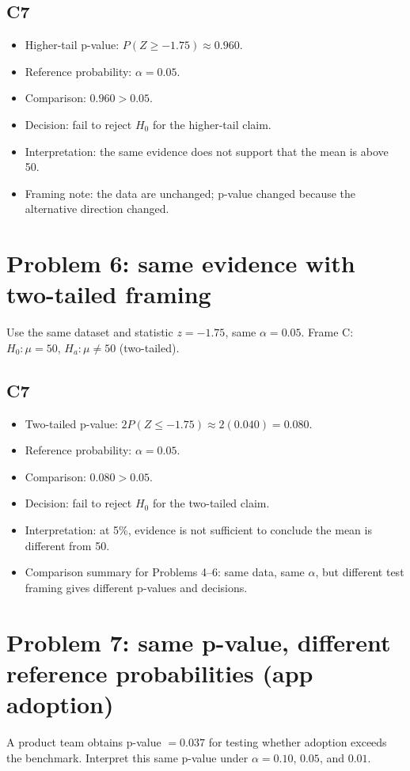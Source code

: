 \begin{ExamProblems}
\subsection*{C7}
\begin{itemize}
    \item Higher-tail p-value: \(P(Z\ge -1.75)\approx 0.960\).
    \item Reference probability: \(\alpha=0.05\).
    \item Comparison: \(0.960>0.05\).
    \item Decision: fail to reject \(H_0\) for the higher-tail claim.
    \item Interpretation: the same evidence does not support that the mean is above 50.
    \item Framing note: the data are unchanged; p-value changed because the alternative direction changed.
\end{itemize}

\item
\section{Problem 6: same evidence with two-tailed framing}
Use the same dataset and statistic \(z=-1.75\), same \(\alpha=0.05\).
Frame C: \(H_0:\mu=50\), \(H_a:\mu\ne 50\) (two-tailed).

\subsection*{C7}
\begin{itemize}
    \item Two-tailed p-value: \(2P(Z\le -1.75)\approx 2(0.040)=0.080\).
    \item Reference probability: \(\alpha=0.05\).
    \item Comparison: \(0.080>0.05\).
    \item Decision: fail to reject \(H_0\) for the two-tailed claim.
    \item Interpretation: at 5\%, evidence is not sufficient to conclude the mean is different from 50.
    \item Comparison summary for Problems 4--6: same data, same \(\alpha\), but different test framing gives different p-values and decisions.
\end{itemize}

\item
\section{Problem 7: same p-value, different reference probabilities (app adoption)}
A product team obtains p-value \(=0.037\) for testing whether adoption exceeds the benchmark.
Interpret this same p-value under \(\alpha=0.10\), \(0.05\), and \(0.01\).


\end{ExamProblems}
